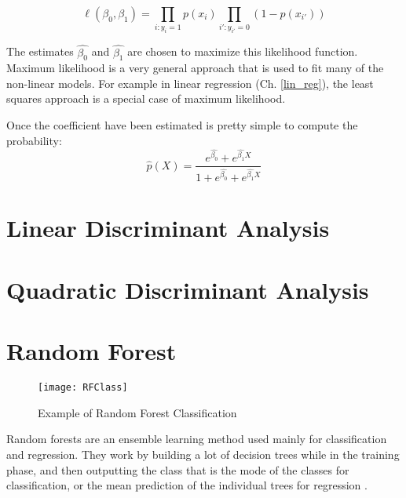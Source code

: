 \begin{equation} \label{eq:logr4}
\ell(\beta_{0}, \beta_{1}) = \prod_{i:y_i = 1}p(x_i) \prod_{i':{y_{i'}} = 0} (1- p(x_{i'}))
\end{equation} 

The estimates $\hat{\beta_{0}}$ and $\hat{\beta_{1}}$ are chosen to maximize this likelihood function.\\
Maximum likelihood is a very general approach that is used to fit many of the non-linear models. For example in linear regression (Ch. \ref{lin_reg}), the least squares approach is a special case of maximum likelihood.

Once the coefficient have been estimated is pretty simple to compute the probability:
\begin{equation}
\hat{p}(X) = \frac{e^{\hat{\beta_{0}}} + e^{\hat{\beta_{1}}X}}{1+ e^{\hat{\beta_{0}}} + e^{\hat{\beta_{1}}X}}
\end{equation}

\pagebreak

\section{Linear Discriminant Analysis} \label{lda}

\pagebreak

\section{Quadratic Discriminant Analysis} \label{qda}

\pagebreak

\section{Random Forest} \label{random_forest}

\begin{figure}[H]
	\centering
	\texttt{[image: RFClass]}
	\caption{Example of Random Forest Classification \cite{medium:RF}}
	\label{fig:RFClass}
\end{figure}

Random forests are an ensemble learning method used mainly for classification and regression. They work by building a lot of decision trees while in the training phase, and then outputting the class that is the mode of the classes for classification, or the mean prediction of the individual trees for regression \cite{wiki:randomforest}.

